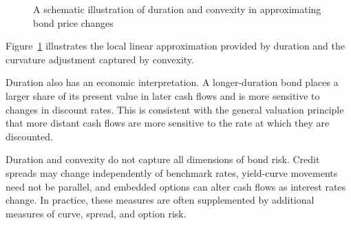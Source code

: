 \begin{figure}[H]
\centering


\caption{A schematic illustration of duration and convexity in approximating bond price changes}
\label{fig:ch8-duration-convexity-concept}
\end{figure}

Figure~\ref{fig:ch8-duration-convexity-concept} illustrates the local linear approximation provided by duration and the curvature adjustment captured by convexity.

Duration also has an economic interpretation. A longer-duration bond places a larger share of its present value in later cash flows and is more sensitive to changes in discount rates. This is consistent with the general valuation principle that more distant cash flows are more sensitive to the rate at which they are discounted.

Duration and convexity do not capture all dimensions of bond risk. Credit spreads may change independently of benchmark rates, yield-curve movements need not be parallel, and embedded options can alter cash flows as interest rates change. In practice, these measures are often supplemented by additional measures of curve, spread, and option risk.

